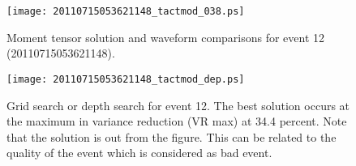 \documentclass[11pt,titlepage,fleqn]{article}
\begin{document}
\begin{figure}
\centering
\texttt{[image: 20110715053621148\_tactmod\_038.ps]}
\caption[Moment tensor solution for event 12]
{{
Moment tensor solution and waveform comparisons for event 12 (20110715053621148).
\label{fig:20110715053621148}
}}
\end{figure} 

\clearpage\pagebreak

\begin{figure}
\centering
\texttt{[image: 20110715053621148\_tactmod\_dep.ps]}
\caption[Depth search solution for event 12]
{{
Grid search or depth search for event 12. The best solution occurs at the maximum in variance reduction (VR max) at 34.4 percent. Note that the solution is out from the figure. This can be related to the quality of the event which is considered as bad event.
\label{fig:_dep}
}}
\end{figure}


\clearpage\pagebreak




\end{document}
